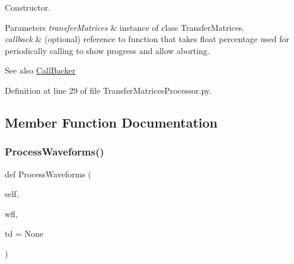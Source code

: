 Constructor. 


\begin{DoxyParams}{Parameters}
{\em transfer\+Matrices} & instance of class Transfer\+Matrices. \\
\hline
{\em callback} & (optional) reference to function that takes float percentage used for periodically calling to show progress and allow aborting. \\
\hline
\end{DoxyParams}
\begin{DoxySeeAlso}{See also}
\hyperlink{namespaceSignalIntegrity_1_1CallBacker}{Call\+Backer} 
\end{DoxySeeAlso}


Definition at line 29 of file Transfer\+Matrices\+Processor.\+py.



\subsection{Member Function Documentation}
\mbox{\label{classSignalIntegrity_1_1TimeDomain_1_1Filters_1_1TransferMatricesProcessor_1_1TransferMatricesProcessor_a407999013bef4f9b70aae3375dc839c9}} 
\subsubsection{\texorpdfstring{Process\+Waveforms()}{ProcessWaveforms()}}
{\footnotesize\ttfamily def Process\+Waveforms (\begin{DoxyParamCaption}\item[{}]{self,  }\item[{}]{wfl,  }\item[{}]{td = {\ttfamily None} }\end{DoxyParamCaption})}



